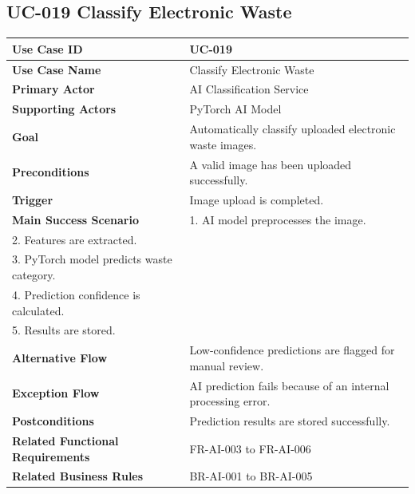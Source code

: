 \subsection{UC-019 Classify Electronic Waste}

\begin{longtable}{|p{4cm}|p{10cm}|}

\hline
\textbf{Use Case ID} &
UC-019 \\
\hline

\textbf{Use Case Name} &
Classify Electronic Waste \\
\hline

\textbf{Primary Actor} &
AI Classification Service \\
\hline

\textbf{Supporting Actors} &
PyTorch AI Model \\
\hline

\textbf{Goal} &
Automatically classify uploaded electronic waste images. \\
\hline

\textbf{Preconditions} &
A valid image has been uploaded successfully. \\
\hline

\textbf{Trigger} &
Image upload is completed. \\
\hline

\textbf{Main Success Scenario} &
1. AI model preprocesses the image.\\
2. Features are extracted.\\
3. PyTorch model predicts waste category.\\
4. Prediction confidence is calculated.\\
5. Results are stored.\\
\hline

\textbf{Alternative Flow} &
Low-confidence predictions are flagged for manual review.\\
\hline

\textbf{Exception Flow} &
AI prediction fails because of an internal processing error.\\
\hline

\textbf{Postconditions} &
Prediction results are stored successfully.\\
\hline

\textbf{Related Functional Requirements} &
FR-AI-003 to FR-AI-006 \\
\hline

\textbf{Related Business Rules} &
BR-AI-001 to BR-AI-005 \\
\hline

\end{longtable}


